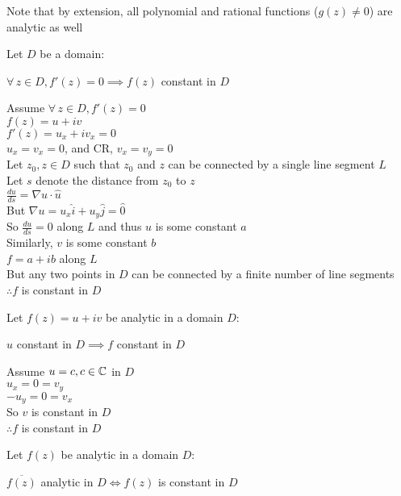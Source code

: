 \documentclass[letterpaper,12pt,fleqn]{article}
\newcommand{\conj}[1]{\overline{#1}}
\begin{document}
Note that by extension, all polynomial and rational functions ($g(z)\ne0$) are
analytic as well

\begin{theorem}
  Let $D$ be a domain:

  $\forall\,z\in D,f'(z)=0\implies f(z)$ constant in $D$
\end{theorem}

\begin{theproof}
  Assume $\forall\,z\in D,f'(z)=0$ \\
  $f(z)=u+iv$ \\
  $f'(z)=u_x+iv_x=0$ \\
  $u_x=v_x=0$, and CR, $v_x=v_y=0$ \\
  Let $z_0,z\in D$ such that $z_0$ and $z$ can be connected by a single line
  segment $L$ \\
  Let $s$ denote the distance from $z_0$ to $z$ \\
  $\frac{du}{ds}=\nabla{u}\cdot\hat{u}$ \\
  But $\nabla{u}=u_x\hat{i}+u_y\hat{j}=\hat{0}$ \\
  So $\frac{du}{ds}=0$ along $L$ and thus $u$ is some constant $a$ \\
  Similarly, $v$ is some constant $b$ \\
  $f=a+ib$ along $L$ \\
  But any two points in $D$ can be connected by a finite number of line
  segments \\
  $\therefore f$ is constant in $D$
\end{theproof}

\begin{theorem}
  Let $f(z)=u+iv$ be analytic in a domain $D$:

  $u$ constant in $D\implies f$ constant in $D$
\end{theorem}

\begin{theproof}
  Assume $u=c,c\in\mathbb{C}$ in $D$ \\
  $u_x=0=v_y$ \\
  $-u_y=0=v_x$ \\
  So $v$ is constant in $D$ \\
  $\therefore f$ is constant in $D$
\end{theproof}

\begin{theorem}
  Let $f(z)$ be analytic in a domain $D$:

  $\conj{f(z)}$ analytic in $D\iff f(z)$ is constant in $D$
\end{theorem}
\end{document}
